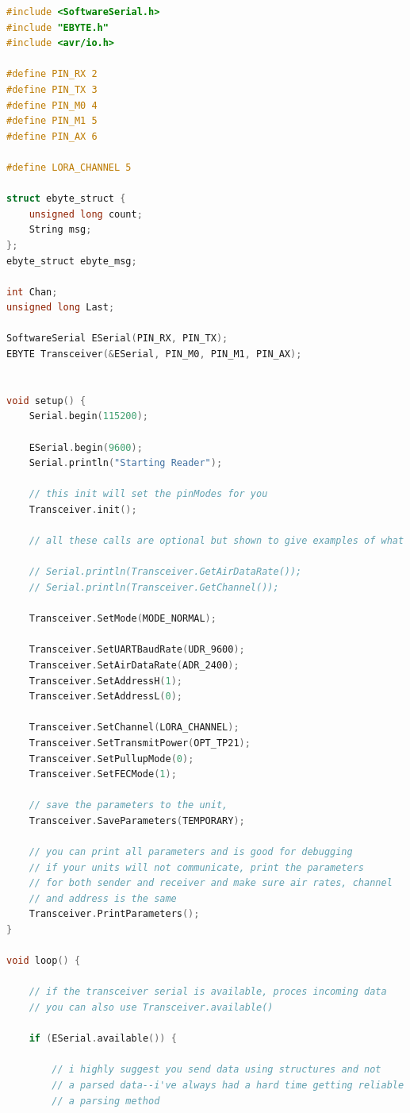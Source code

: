 \documentclass[12pt]{article}
\begin{document}
	\begin{lstlisting}[language=C]
#include <SoftwareSerial.h>
#include "EBYTE.h"
#include <avr/io.h>

#define PIN_RX 2
#define PIN_TX 3
#define PIN_M0 4
#define PIN_M1 5
#define PIN_AX 6

#define LORA_CHANNEL 5

struct ebyte_struct {
	unsigned long count;
	String msg;                                           
};
ebyte_struct ebyte_msg;

int Chan;
unsigned long Last;

SoftwareSerial ESerial(PIN_RX, PIN_TX);
EBYTE Transceiver(&ESerial, PIN_M0, PIN_M1, PIN_AX);


void setup() {
	Serial.begin(115200);
	
	ESerial.begin(9600);
	Serial.println("Starting Reader");
	
	// this init will set the pinModes for you
	Transceiver.init();
	
	// all these calls are optional but shown to give examples of what you can do
	
	// Serial.println(Transceiver.GetAirDataRate());
	// Serial.println(Transceiver.GetChannel());
	
	Transceiver.SetMode(MODE_NORMAL);
	
	Transceiver.SetUARTBaudRate(UDR_9600);
	Transceiver.SetAirDataRate(ADR_2400);
	Transceiver.SetAddressH(1);
	Transceiver.SetAddressL(0);
	
	Transceiver.SetChannel(LORA_CHANNEL);
	Transceiver.SetTransmitPower(OPT_TP21);
	Transceiver.SetPullupMode(0);
	Transceiver.SetFECMode(1);
	
	// save the parameters to the unit,
	Transceiver.SaveParameters(TEMPORARY);
	
	// you can print all parameters and is good for debugging
	// if your units will not communicate, print the parameters
	// for both sender and receiver and make sure air rates, channel
	// and address is the same
	Transceiver.PrintParameters();
}

void loop() {
	
	// if the transceiver serial is available, proces incoming data
	// you can also use Transceiver.available()
	
	if (ESerial.available()) {
		
		// i highly suggest you send data using structures and not
		// a parsed data--i've always had a hard time getting reliable data using
		// a parsing method
		

\end{lstlisting}
\end{document}
